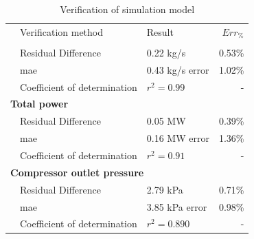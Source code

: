 \begin{table}[h!]
	\centering
	\begin{tabular}{p{0.5cm}p{8cm}p{5cm}r}
		\hline
		&Verification method & Result & $Err_{\%}$\\
		\hhline{====}
		 \multicolumn{4}{l}{\textbf{ Total Flow}}\\
		&Residual Difference  & 0.22 kg/s & 0.53\% \\
		&\gls{mae} 					 & 0.43 kg/s error & 1.02\% \\
		&Coefficient of determination & $r^2 =0.99$ & -\\ 
		 \multicolumn{4}{l}{\textbf{ Total power}}\\
		&Residual Difference  & 0.05 MW & 0.39\% \\
		&\gls{mae} 					 & 0.16 MW error & 1.36\% \\
		&Coefficient of determination & $r^2 =0.91$ & -\\ 
		 \multicolumn{4}{l}{\textbf{ Compressor outlet pressure}}\\
		&Residual Difference  & 2.79 kPa & 0.71\% \\
		&\gls{mae} 					 & 3.85 kPa error & 0.98\% \\
		&Coefficient of determination & $r^2 =0.890$ & -\\
		 	\hline
	\end{tabular} 
	\caption{Verification of simulation model}
	\label{Kus verification table}
\end{table}
